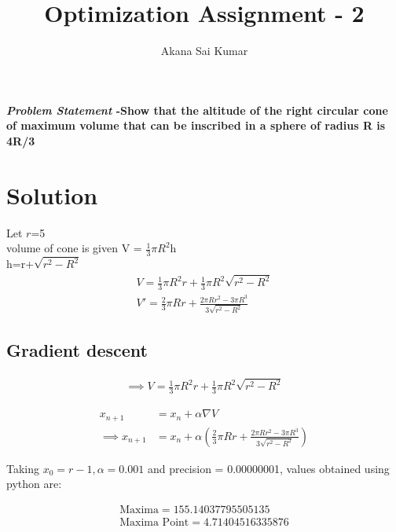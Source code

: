 \documentclass[journal,10pt,twocolumn]{article}
\title{\textbf{Optimization Assignment - 2}}
\author{Akana Sai Kumar}
\providecommand{\brak}[1]{\ensuremath{\left(#1\right)}}
\begin{document}
\maketitle
\paragraph{\textit{Problem Statement} -Show that the altitude of the right circular cone of maximum volume that can be inscribed in a sphere of radius R is 4R/3}
\section*{\large Solution}
Let $r$=5\\
volume of cone is given 
 V = $\frac{1}{3}$$\pi$$R^2$h\\
 h=r+$\sqrt{r^2-R^2}$  
 \begin{align}
V=\frac{1}{3} \pi R^2r+\frac{1}{3}\pi R^2\sqrt{r^2-R^2}\\
V'=\frac{2}{3}\pi Rr+\frac{2\pi R r^2-3\pi R^3}{3\sqrt{r^2-R^2}}
\end{align}
 



\subsection*{\normalsize Gradient descent}

\begin{align}
	\label{eq:vol_varx}
	\implies V = \frac{1}{3} \pi R^2r+\frac{1}{3}\pi R^2\sqrt{r^2-R^2}
\end{align}

    \begin{align}
        x_{n+1} &= x_n + \alpha \nabla V \\
        \implies x_{n+1} &= x_n + \alpha \brak{\frac{2}{3}\pi Rr+\frac{2\pi R r^2-3\pi R^3}{3\sqrt{r^2-R^2}}}
    \end{align}
    
Taking $x_0=r-1,\alpha=0.001$ and precision = 0.00000001, values obtained using python are:
    
    \begin{align}
        \boxed{\text{Maxima} = 155.14037795505135}\\
        \boxed{\text{Maxima Point} = 4.71404516335876}
    \end{align}
\end{document}
